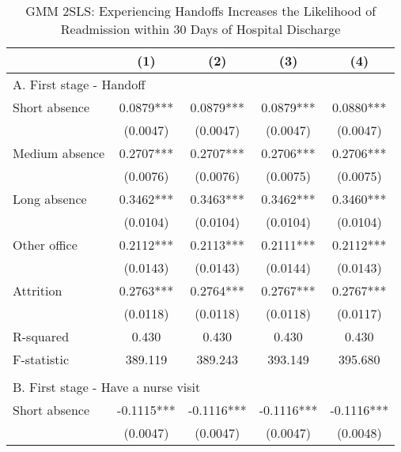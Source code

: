 \documentclass[final,12pt, notitlepage]{article}
\begin{document}
\begin{singlespace}
\newpage
\begin{table}[H]
\footnotesize
\setlength\tabcolsep{0pt}
\centering
\caption{GMM 2SLS: Experiencing Handoffs Increases the Likelihood of Readmission within 30 Days of Hospital Discharge}
\label{tab:iv30}
\begin{threeparttable}
{
\def\sym#1{\ifmmode^{#1}\else\(^{#1}\)\fi}
\begin{tabular*}{\textwidth}{l@{\extracolsep{\fill}}*{4}{c}} %
\toprule
                    &\multicolumn{1}{c}{(1)}&\multicolumn{1}{c}{(2)}&\multicolumn{1}{c}{(3)}&\multicolumn{1}{c}{(4)}\\
\midrule
\multicolumn{5}{l}{A. First stage - Handoff} \\
Short absence       &      0.0879***&      0.0879***&      0.0879***&      0.0880***\\
                    &    (0.0047)   &    (0.0047)   &    (0.0047)   &    (0.0047)   \\
Medium absence      &      0.2707***&      0.2707***&      0.2706***&      0.2706***\\
                    &    (0.0076)   &    (0.0076)   &    (0.0075)   &    (0.0075)   \\
Long absence        &      0.3462***&      0.3463***&      0.3462***&      0.3460***\\
                    &    (0.0104)   &    (0.0104)   &    (0.0104)   &    (0.0104)   \\
Other office        &      0.2112***&      0.2113***&      0.2111***&      0.2112***\\
                    &    (0.0143)   &    (0.0143)   &    (0.0144)   &    (0.0143)   \\
Attrition           &      0.2763***&      0.2764***&      0.2767***&      0.2767***\\
                    &    (0.0118)   &    (0.0118)   &    (0.0118)   &    (0.0117)   \\
R-squared           &      0.430   &      0.430   &      0.430   &      0.430   \\
F-statistic         &    389.119   &    389.243   &    393.149   &    395.680   \\
\\
\multicolumn{5}{l}{B. First stage - Have a nurse visit} \\
Short absence       &     -0.1115***&     -0.1116***&     -0.1116***&     -0.1116***\\
                    &    (0.0047)   &    (0.0047)   &    (0.0047)   &    (0.0048)   \\

\end{tabular*}}
\end{threeparttable}
\end{table}
\end{singlespace}
\end{document}
